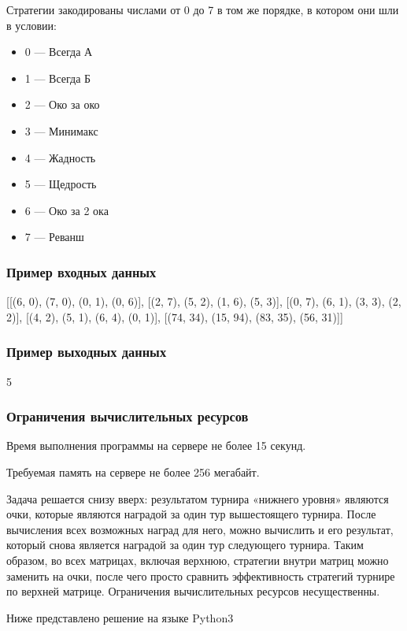 Стратегии закодированы числами от 0 до 7 в том же порядке, в котором они шли в условии:

\begin{itemize}
    \item 0 — Всегда А
    \item 1 — Всегда Б
    \item 2 — Око за око
    \item 3 — Минимакс
    \item 4 — Жадность
    \item 5 — Щедрость
    \item 6 — Око за 2 ока
    \item 7 — Реванш
\end{itemize}

\subsubsection*{Пример входных данных}
[[(6, 0), (7, 0), (0, 1), (0, 6)], [(2, 7), (5, 2), (1, 6), (5, 3)], [(0, 7), (6, 1), (3, 3), (2, 2)], [(4, 2), (5, 1), (6, 4), (0, 1)], [(74, 34), (15, 94), (83, 35), (56, 31)]]

\subsubsection*{Пример выходных данных}
5

\subsubsection*{Ограничения вычислительных ресурсов}

Время выполнения программы на сервере не более 15 секунд.

Требуемая память на сервере не более 256 мегабайт.

\solutionSection

Задача решается снизу вверх: результатом турнира «нижнего уровня» являются очки, которые являются наградой за один тур вышестоящего турнира. После вычисления всех возможных наград для него, можно вычислить и его результат, который снова является наградой за один тур следующего турнира. Таким образом, во всех матрицах, включая верхнюю, стратегии внутри матриц можно заменить на очки, после чего просто сравнить эффективность стратегий турнире по верхней матрице. Ограничения вычислительных ресурсов несущественны.

\codeExample

Ниже представлено решение на языке Python3

\inputminted[fontsize=\footnotesize, linenos]{python}{2nd_tour/ies/task_03/source_1.py}

